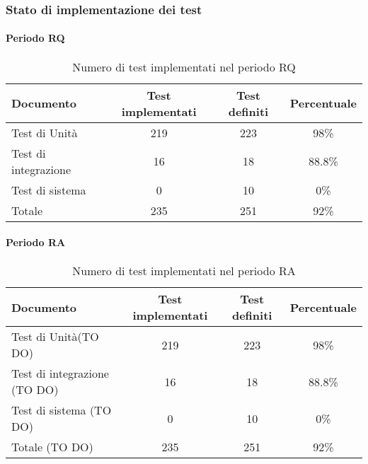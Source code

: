 \documentclass[PdQ.tex]{subfiles}
\begin{document}
\subsubsection{Stato di implementazione dei test}
\paragraph{Periodo RQ}
	\begin{table}[h]
				\centering
				\begin{tabular}{l c c c}
					\hline
					\rule[-0.3cm]{0cm}{0.8cm}
					\textbf{Documento} & \textbf{Test implementati} & \textbf{Test definiti} & \textbf{Percentuale}\\
					\hline
					\rule[0cm]{0cm}{0.4cm}
					Test di Unità & 219 & 223 & 98\% \\
					\rule[0cm]{0cm}{0.4cm}
					Test di integrazione & 16 & 18 & 88.8\% \\
					\rule[0cm]{0cm}{0.4cm}
					Test di sistema & 0 & 10 & 0\% \\
					\rule[0cm]{0cm}{0.4cm}
					Totale & 235 & 251 & 92\% \\
					\hline
				\end{tabular}
				\caption{Numero di test implementati nel periodo RQ}
			\end{table}
			\clearpage
\paragraph{Periodo RA}
	\begin{table}[h]
				\centering
				\begin{tabular}{l c c c}
					\hline
					\rule[-0.3cm]{0cm}{0.8cm}
					\textbf{Documento} & \textbf{Test implementati} & \textbf{Test definiti} & \textbf{Percentuale}\\
					\hline
					\rule[0cm]{0cm}{0.4cm}
					Test di Unità(TO DO) & 219 & 223 & 98\% \\
					\rule[0cm]{0cm}{0.4cm}
					Test di integrazione (TO DO) & 16 & 18 & 88.8\% \\
					\rule[0cm]{0cm}{0.4cm}
					Test di sistema (TO DO) & 0 & 10 & 0\% \\
					\rule[0cm]{0cm}{0.4cm}
					Totale (TO DO) & 235 & 251 & 92\% \\
					\hline
				\end{tabular}
				\caption{Numero di test implementati nel periodo RA}
			\end{table}
\end{document}
